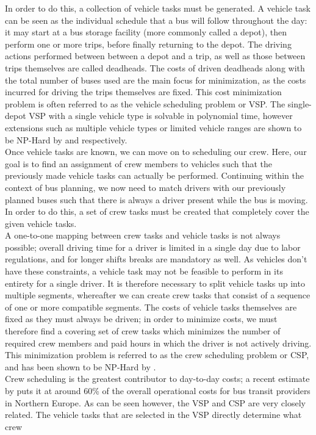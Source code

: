\documentclass[]{article}
\begin{document}
In order to do this, a collection of vehicle tasks must be generated. A vehicle task can be seen as the individual schedule that a bus will follow throughout the day: it may start at a bus storage facility (more commonly called a depot), then perform one or more trips, before finally returning to the depot. The driving actions performed between between a depot and a trip, as well as those between trips themselves are called deadheads. The costs of driven deadheads along with the total number of buses used are the main focus for minimization, as the costs incurred for driving the trips themselves are fixed. This cost minimization problem is often referred to as the vehicle scheduling problem or VSP. The single-depot VSP with a single vehicle type is solvable in polynomial time, however extensions such as multiple vehicle types or limited vehicle ranges are shown to be NP-Hard by \citet{Bunte2009} and \citet{Haghani2002} respectively. \\
Once vehicle tasks are known, we can move on to scheduling our crew. Here, our goal is to find an assignment of crew members to vehicles  such that the previously made vehicle tasks can actually be performed. Continuing within the context of bus planning, we now need to match drivers with our previously planned buses such that there is always a driver present while the bus is moving. In order to do this, a set of crew tasks must be created that completely cover the given vehicle tasks. \\ 
A one-to-one mapping between crew tasks and vehicle tasks is not always possible; overall driving time for a driver is limited in a single day due to labor regulations, and for longer shifts breaks are mandatory as well. As vehicles don't have these constraints, a vehicle task may not be feasible to perform in its entirety for a single driver. It is therefore necessary to split vehicle tasks up into multiple segments, whereafter we can create crew tasks that consist of a sequence of one or more compatible segments. The costs of vehicle tasks themselves are fixed as they must always be driven; in order to minimize costs, we must therefore find a covering set of crew tasks which minimizes the number of required crew members and paid hours in which the driver is not actively driving. This minimization problem is referred to as the crew scheduling problem or CSP, and has been shown to be NP-Hard by \citet{Fischetti1989}. \\ 
Crew scheduling is the greatest contributor to day-to-day costs; a recent estimate by \citet{Perumal2019Crew} puts it at around 60\% of the overall operational costs for bus transit providers in Northern Europe. As can be seen however, the VSP and CSP are very closely related. The vehicle tasks that are selected in the VSP directly determine what crew
\end{document}
